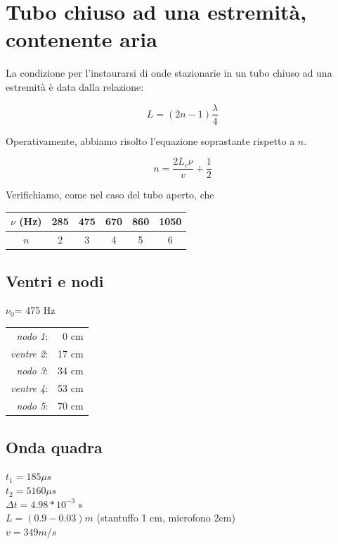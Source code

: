 \documentclass[a4paper,10pt]{report}
\begin{document}
 
\section{Tubo chiuso ad una estremità, contenente aria}

La condizione per l'instaurarsi di onde stazionarie in un tubo chiuso ad una estremità è data dalla relazione:

\begin{equation}
 L=(2n-1)\frac{\lambda}{4}
\end{equation}

Operativamente, abbiamo risolto l'equazione soprastante rispetto a $n$.

$$ n = \frac{2L_c\nu}{v} + \frac{1}{2} $$

Verifichiamo, come nel caso del tubo aperto, che 

\begin{center}
\begin{tabular}{c|c|c|c|c|c}
$\nu$ (Hz) & 285 & 475 & 670 & 860 & 1050 \\
\midrule
$n$ & 2 & 3 & 4 & 5 & 6 \\
\end{tabular}
\end{center}

\subsection{Ventri e nodi}
$\nu_0$= 475 Hz\\

\begin{center}
\begin{tabular}{r r}
\textit{nodo 1}: & 0 cm\\
\textit{ventre 2}: & 17 cm\\
\textit{nodo 3}: & 34 cm\\
\textit{ventre 4}: & 53 cm\\
\textit{nodo 5}: & 70 cm\\
\end{tabular}

\end{center}

\subsection{Onda quadra}
$t_1 = 185 \mu s $\\
$t_2 = 5160 \mu s $\\
$\Delta t = 4.98*10^{-3}$ s\\
$L = (0.9 - 0.03) m $ (stantuffo 1 cm, microfono 2cm)\\
$v = 349 m/s$
\end{document}
